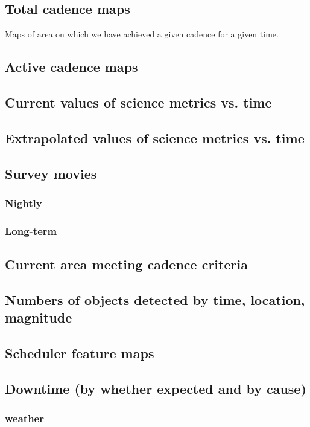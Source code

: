\subsection{Total cadence maps}
\label{sec:orgc4a2248}
Maps of area on which we have achieved a given cadence for a given time.
\subsection{Active cadence maps}
\label{sec:orgdacea43}
\subsection{Current values of science metrics vs. time}
\label{sec:org42b9162}
\subsection{Extrapolated values of science metrics vs. time}
\label{sec:orgb8b6c07}
\subsection{Survey movies}
\label{sec:orga0225c4}
\subsubsection{Nightly}
\label{sec:org429ad03}
\subsubsection{Long-term}
\label{sec:org54cbe3a}
\subsection{Current area meeting cadence criteria}
\label{sec:orgb46ba0f}
\subsection{Numbers of objects detected by time, location, magnitude}
\label{sec:org68a9983}
\subsection{Scheduler feature maps}
\label{sec:org6cf2f01}
\subsection{Downtime (by whether expected and by cause)}
\label{sec:org8fba262}
\subsubsection{weather}
\label{sec:orgcc1d347}
